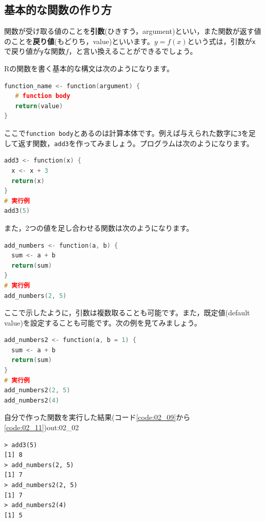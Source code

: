 \documentclass{ltjsbook}
\begin{document}
\subsection{基本的な関数の作り方}

関数が受け取る値のことを\textbf{引数}(ひきすう，argument)といい，また関数が返す値のことを\textbf{戻り値}(もどりち，value)といいます。$y=f(x)$という式は，引数が\verb|x|で戻り値が\verb|y|な関数$f$，と言い換えることができるでしょう。

Rの関数を書く基本的な構文は次のようになります。

\begin{lstlisting}[language=c++,label={code:02_08},caption={関数を作る基本的な構文}]
function_name <- function(argument) {
   # function body
   return(value)
}
\end{lstlisting}

ここで\verb|function body|とあるのは計算本体です。例えば与えられた数字に\verb|3|を足して返す関数，\verb|add3|を作ってみましょう。プログラムは次のようになります。

\begin{lstlisting}[language=c++,label={code:02_09},caption={引数を1つとる関数}]
add3 <- function(x) {
  x <- x + 3
  return(x)
}
# 実行例
add3(5)
\end{lstlisting}

また，2つの値を足し合わせる関数は次のようになります。

\begin{lstlisting}[language=c++,label={code:02_10},caption={引数を2つとる関数}]
add_numbers <- function(a, b) {
  sum <- a + b
  return(sum)
}
# 実行例
add_numbers(2, 5)
\end{lstlisting}

ここで示したように，引数は複数取ることも可能です。また，既定値(default value)を設定することも可能です。次の例を見てみましょう。

\begin{lstlisting}[language=c++,label={code:02_11},caption={引数に既定値を与える}]
add_numbers2 <- function(a, b = 1) {
  sum <- a + b
  return(sum)
}
# 実行例
add_numbers2(2, 5)
add_numbers2(4)
\end{lstlisting}

\begin{Rscreen}{自分で作った関数を実行した結果(コード\ref{code:02_09}から\ref{code:02_11})}{out:02_02}
	\begin{verbatim}
> add3(5)
[1] 8
> add_numbers(2, 5)
[1] 7
> add_numbers2(2, 5)
[1] 7
> add_numbers2(4)
[1] 5
\end{verbatim}
\end{Rscreen}
\end{document}
